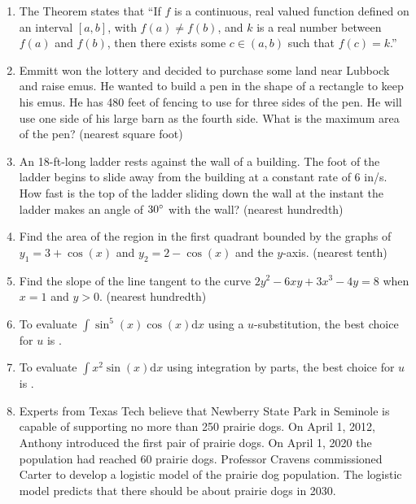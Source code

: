 \documentclass[../uilmath.tex]{subfiles}
\begin{document}
\begin{enumerate}[label=\bfseries\arabic*.]
    \item %
    The \blank Theorem states that ``If $f$ is a continuous, real valued function defined on an interval $[a,b]$, 
    with $f(a)\neq f(b)$, and $k$ is a real number between $f(a)$ and $f(b)$, then there exists some $c\in (a,b)$ such that $f(c)=k$.''

    \item %
    Emmitt won the lottery and decided to purchase some land near Lubbock and raise emus. He wanted to build a pen in the 
    shape of a rectangle to keep his emus. He has 480 feet of fencing to use for three sides of the pen. He will use one side of 
    his large barn as the fourth side. What is the maximum area of the pen? (nearest square foot)

    \item %
    An 18-ft-long ladder rests against the wall of a building. The foot of the ladder begins to slide away from the building at a constant rate of 6 in/s. How fast is the 
    top of the ladder sliding down the wall at the instant the ladder makes an angle of $30\degree$ with the wall? (nearest hundredth)

    \item %
    Find the area of the region in the first quadrant bounded by the graphs of $y_1=3+\cos(x)$ and $y_2=2-\cos(x)$ and the $y$-axis. (nearest tenth)

    \item %
    Find the slope of the line tangent to the curve $2y^2-6xy+3x^3-4y=8$ when $x=1$ and $y>0$. (nearest hundredth)

    \item %
    To evaluate $\int \sin^5(x)\cos(x)\mathrm{d}x$ using a $u$-substitution, the best choice for $u$ is \blank.

    \item %
    To evaluate $\int x^2\sin(x)\mathrm{d}x$ using integration by parts, the best choice for $u$ is \blank.

    \item %
    Experts from Texas Tech believe that Newberry State Park in Seminole is capable of supporting no more than 250 prairie dogs.
    On April 1, 2012, Anthony introduced the first pair of prairie dogs. On April 1, 2020 the population had reached 60 prairie dogs.
    Professor Cravens commissioned Carter to develop a logistic model of the prairie dog population. The logistic model predicts that there should be 
    about \blank prairie dogs in 2030.



\end{enumerate}
\end{document}
